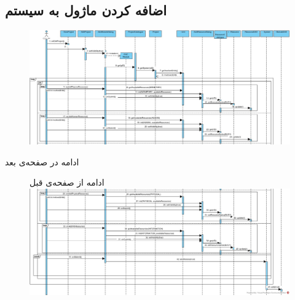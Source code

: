 \begin{landscape}
\section{اضافه کردن ماژول به سیستم}
\begin{figure}[H]
	\centering
	\includegraphics[scale=0.55]{img/sequence-design/AddModuleToSystem-1}
\end{figure}
ادامه در صفحه‌ی بعد\\

\begin{figure}[H]
ادامه از صفحه‌ی قبل \\

	\includegraphics[scale=0.55]{img/sequence-design/AddModuleToSystem-2}
\end{figure}


\end{landscape}
